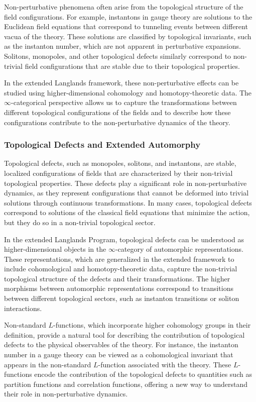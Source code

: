 \documentclass{article}
\theoremstyle{remark}
\begin{document}
Non-perturbative phenomena often arise from the topological structure of the field configurations. For example, instantons in gauge theory are solutions to the Euclidean field equations that correspond to tunneling events between different vacua of the theory. These solutions are classified by topological invariants, such as the instanton number, which are not apparent in perturbative expansions. Solitons, monopoles, and other topological defects similarly correspond to non-trivial field configurations that are stable due to their topological properties.

In the extended Langlands framework, these non-perturbative effects can be studied using higher-dimensional cohomology and homotopy-theoretic data. The $\infty$-categorical perspective allows us to capture the transformations between different topological configurations of the fields and to describe how these configurations contribute to the non-perturbative dynamics of the theory.

\subsubsection{Topological Defects and Extended Automorphy}

Topological defects, such as monopoles, solitons, and instantons, are stable, localized configurations of fields that are characterized by their non-trivial topological properties. These defects play a significant role in non-perturbative dynamics, as they represent configurations that cannot be deformed into trivial solutions through continuous transformations. In many cases, topological defects correspond to solutions of the classical field equations that minimize the action, but they do so in a non-trivial topological sector.

In the extended Langlands Program, topological defects can be understood as higher-dimensional objects in the $\infty$-category of automorphic representations. These representations, which are generalized in the extended framework to include cohomological and homotopy-theoretic data, capture the non-trivial topological structure of the defects and their transformations. The higher morphisms between automorphic representations correspond to transitions between different topological sectors, such as instanton transitions or soliton interactions.

Non-standard $L$-functions, which incorporate higher cohomology groups in their definition, provide a natural tool for describing the contribution of topological defects to the physical observables of the theory. For instance, the instanton number in a gauge theory can be viewed as a cohomological invariant that appears in the non-standard $L$-function associated with the theory. These $L$-functions encode the contribution of the topological defects to quantities such as partition functions and correlation functions, offering a new way to understand their role in non-perturbative dynamics.
\end{document}
